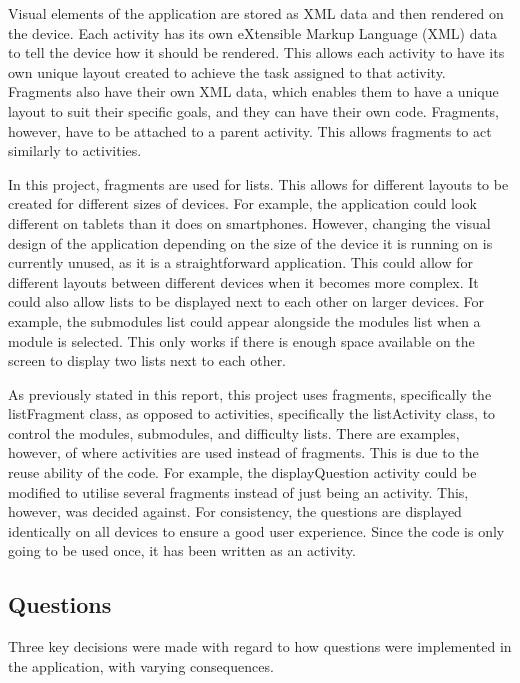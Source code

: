 \documentclass{article}
\begin{document}
Visual elements of the application are stored as XML data and then rendered on the device. Each activity has its own eXtensible Markup Language (XML) data to tell the device how it should be rendered. This allows each activity to have its own unique layout created to achieve the task assigned to that activity. Fragments also have their own XML data, which enables them to have a unique layout to suit their specific goals, and they can have their own code. Fragments, however, have to be attached to a parent activity. This allows fragments to act similarly to activities. \par

In this project, fragments are used for lists. This allows for different layouts to be created for different sizes of devices. For example, the application could look different on tablets than it does on smartphones. However, changing the visual design of the application depending on the size of the device it is running on is currently unused, as it is a straightforward application. This could allow for different layouts between different devices when it becomes more complex. It could also allow lists to be displayed next to each other on larger devices. For example, the submodules list could appear alongside the modules list when a module is selected. This only works if there is enough space available on the screen to display two lists next to each other. \par

As previously stated in this report, this project uses fragments, specifically the listFragment class, as opposed to activities, specifically the listActivity class, to control the modules, submodules, and difficulty lists. There are examples, however, of where activities are used instead of fragments. This is due to the reuse ability of the code. For example, the displayQuestion activity could be modified to utilise several fragments instead of just being an activity. This, however, was decided against. For consistency, the questions are displayed identically on all devices to ensure a good user experience. Since the code is only going to be used once, it has been written as an activity. \par

\subsection{Questions}

Three key decisions were made with regard to how questions were implemented in the application, with varying consequences. \par
\end{document}
